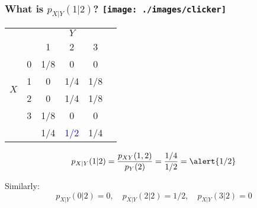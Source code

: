 \begin{frame}
\frametitle{What is $p_{X|Y}(1|2)$? \hfill \texttt{[image: ./images/clicker]}}
\small
\begin{table}
\begin{tabular}{|cc|ccc|c|}
\hline
&&\multicolumn{3}{c|}{$Y$}&\\
&&1 & 2&3&\\
\hline
\multirow{4}{*}{$X$}
&0& \multicolumn{1}{|c}{1/8} & \alert{0}&0&\\
&1& \multicolumn{1}{|c}{0} & \alert{1/4}&1/8&\\
&2& \multicolumn{1}{|c}{0} & \alert{1/4}&1/8&\\
&3& \multicolumn{1}{|c}{1/8} & \alert{0}&0&\\
\hline 
&&1/4&\textcolor{blue}{1/2}&1/4&\\
\hline
\end{tabular}
\end{table}

\pause
\begin{equation*}
	p_{X|Y}(1|2) =\frac{p_{XY}(1,2)}{p_Y(2)}=\frac{1/4}{1/2}= \alert{1/2}
\end{equation*}

  \pause

Similarly: 
$$p_{X|Y}(0|2)=0, \quad p_{X|Y}(2|2)=1/2, \quad p_{X|Y}(3|2)= 0$$


\end{frame}



